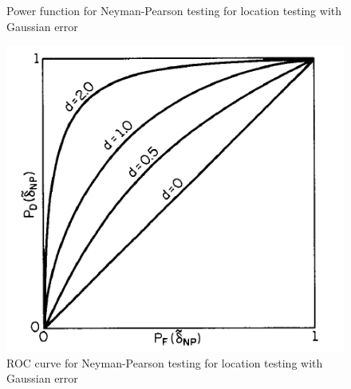 \documentclass[a4paper,english,12pt]{article}
\begin{document}
\begin{exmp}
\begin{figure}[h]
\caption{Power function for Neyman-Pearson testing for location testing with Gaussian error}
\label{fig:Power}
\end{figure}
\begin{figure}[h]
\centering
\includegraphics[width=0.5\linewidth]{Figures/ROC}
\caption{ROC curve for Neyman-Pearson testing for location testing with Gaussian error}
\label{fig:ROC}
\end{figure}
\end{exmp}
\end{document}
